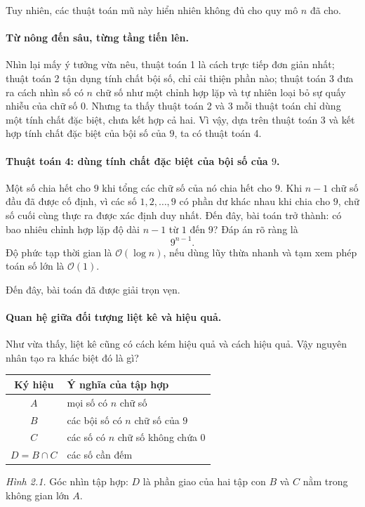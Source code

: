 \documentclass[11pt]{article}
\newcommand{\Oh}{\mathcal{O}}
\begin{document}
Tuy nhiên, các thuật toán mũ này hiển nhiên không đủ cho quy mô \(n\) đã cho.

\paragraph{Từ nông đến sâu, từng tầng tiến lên.}
Nhìn lại mấy ý tưởng vừa nêu, thuật toán 1 là cách trực tiếp đơn giản nhất;
thuật toán 2 tận dụng tính chất bội số, chỉ cải thiện phần nào; thuật toán 3
đưa ra cách nhìn số có \(n\) chữ số như một chỉnh hợp lặp và tự nhiên loại bỏ
sự quấy nhiễu của chữ số \(0\). Nhưng ta thấy thuật toán 2 và 3 mỗi thuật toán
chỉ dùng một tính chất đặc biệt, chưa kết hợp cả hai. Vì vậy, dựa trên thuật
toán 3 và kết hợp tính chất đặc biệt của bội số của \(9\), ta có thuật toán 4.

\paragraph{Thuật toán 4: dùng tính chất đặc biệt của bội số của \(9\).}
Một số chia hết cho \(9\) khi tổng các chữ số của nó chia hết cho \(9\). Khi
\(n-1\) chữ số đầu đã được cố định, vì các số \(1,2,\ldots,9\) có phần dư
khác nhau khi chia cho \(9\), chữ số cuối cùng thực ra được xác định duy nhất.
Đến đây, bài toán trở thành: có bao nhiêu chỉnh hợp lặp độ dài \(n-1\) từ
\(1\) đến \(9\)? Đáp án rõ ràng là
\[
  9^{n-1}.
\]
Độ phức tạp thời gian là \(\Oh(\log n)\), nếu dùng lũy thừa nhanh và tạm xem
phép toán số lớn là \(\Oh(1)\).

Đến đây, bài toán đã được giải trọn vẹn.

\paragraph{Quan hệ giữa đối tượng liệt kê và hiệu quả.}
Như vừa thấy, liệt kê cũng có cách kém hiệu quả và cách hiệu quả. Vậy nguyên
nhân tạo ra khác biệt đó là gì?

\begin{center}
\small
\begin{tabular}{c|l}
Ký hiệu & Ý nghĩa của tập hợp\\
\hline
\(A\) & mọi số có \(n\) chữ số\\
\(B\) & các bội số có \(n\) chữ số của \(9\)\\
\(C\) & các số có \(n\) chữ số không chứa \(0\)\\
\(D=B\cap C\) & các số cần đếm\\
\end{tabular}

\textit{Hình 2.1.} Góc nhìn tập hợp: \(D\) là phần giao của hai tập con
\(B\) và \(C\) nằm trong không gian lớn \(A\).
\end{center}
\end{document}
